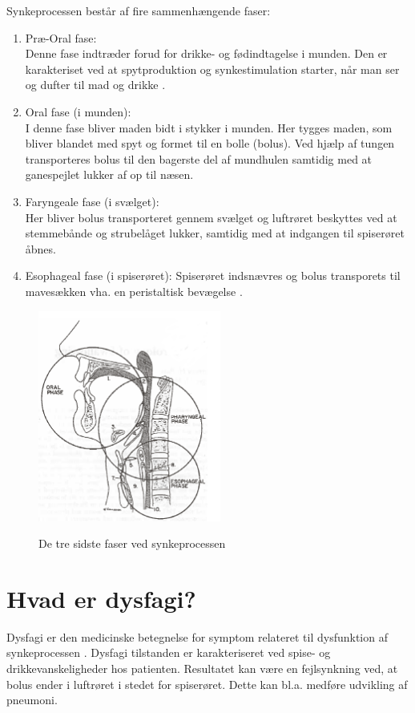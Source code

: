 \documentclass[main.tex]{subfiles}
\begin{document}
Synkeprocessen består af fire sammenhængende faser:
\begin{enumerate}
\item Præ-Oral fase:\\
Denne fase indtræder forud for drikke- og fødindtagelse i munden. Den er karakteriset ved at spytproduktion og synkestimulation starter, når man ser og dufter til mad og drikke \cite [s. 12]{Kjaersgaard2013DifficultiesPerspective}.    
\item Oral fase (i munden): \\
I denne fase bliver maden bidt i stykker i munden. Her tygges maden, som bliver blandet med spyt og formet til en bolle (bolus). Ved hjælp af tungen transporteres bolus til den bagerste del af mundhulen samtidig med at ganespejlet lukker af op til næsen.
\item Faryngeale fase (i svælget): \\ Her bliver bolus transporteret gennem svælget og luftrøret beskyttes ved at stemmebånde og strubelåget lukker, samtidig med at indgangen til spiserøret åbnes.     
\item Esophageal fase (i spiserøret):
Spiserøret indsnævres og bolus transporets til mavesækken vha. en peristaltisk bevægelse \cite [s. 395]{Sand2008MennesketsFysiologi}.
\end{enumerate}

\begin{figure}[H]
\centering
{\includegraphics[width=6cm]
{Figure/dysfagi3faser}}
\caption{De tre sidste faser ved synkeprocessen\cite{Bass1992Dysphagia:Management}}
\label{trefaser}
\end{figure}


\section{Hvad er dysfagi?}
Dysfagi er den medicinske betegnelse for symptom relateret til dysfunktion af synkeprocessen \cite{KjaersgaardPh.d.studerendeDYSFAGIKonsekvenser}. Dysfagi tilstanden er karakteriseret ved spise- og drikkevanskeligheder hos patienten. Resultatet kan være en fejlsynkning ved, at bolus ender i luftrøret i stedet for spiserøret. Dette kan bl.a. medføre udvikling af pneumoni.
\end{document}
